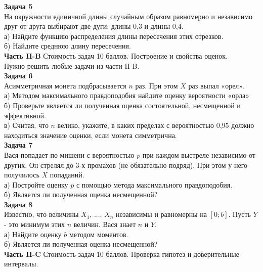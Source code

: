 \documentclass[12pt, a4paper]{article}\usepackage[]{graphicx}\usepackage[]{color}
\begin{document}
	\textbf{Задача 5} \\
	На окружности единичной длины случайным образом равномерно и независимо друг от друга выбирают две дуги: длины 0,3 и длины 0,4. \\
	а) Найдите функцию распределения длины пересечения этих отрезков. \\
	б) Найдите среднюю длину пересечения. \\



	\textbf{Часть II-B} Стоимость задач 10 баллов. Построение и свойства оценок. \\

	Нужно решить любые \textbf{} задачи из части II-B. \\

	\textbf{Задача 6} \\
	Асимметричная монета подбрасывается $n$ раз. При этом $X$ раз выпал «орел». \\
	а) Методом максимального правдоподобия найдите оценку вероятности «орла» \\
	б) Проверьте является ли полученная оценка состоятельной, несмещенной и эффективной.\\
	в) Считая, что $n$ велико, укажите, в каких пределах с вероятностью 0,95 должно находиться значение оценки, если монета симметрична. \\


	\textbf{Задача 7} \\
	Вася попадает по мишени с вероятностью $p$ при каждом выстреле независимо от других. Он стрелял до 3-х промахов (не обязательно подряд). При этом у него получилось $X$ попаданий. \\
	а) Постройте оценку $p$ с помощью метода максимального правдоподобия. \\
	б) Является ли полученная оценка несмещенной? \\


	\textbf{Задача 8} \\
	Известно, что величины $X_{1}$, ..., $X_{n}$ независимы и равномерны на $[0;b]$. Пусть $Y$- это минимум этих $n$ величин. Вася знает $n$ и $Y$. \\
	а) Найдите оценку $b$ методом моментов. \\
	б) Является ли полученная оценка несмещенной? \\


	\textbf{Часть II-C} Стоимость задач 10 баллов. Проверка гипотез и доверительные интервалы. \\
\end{document}
